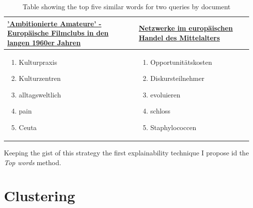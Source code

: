 \begin{table}
	\centering
	\begin{tabular}{ p{6cm} | p{6cm} }
		\href{https://gepris.dfg.de/gepris/projekt/387798678}{'Ambitionierte Amateure' - Europäische Filmclubs in den langen 1960er Jahren} & \href{https://gepris.dfg.de/gepris/projekt/160874660}{Netzwerke im europäischen Handel des Mittelalters} \\ \hline
		\begin{enumerate}
			\item Kulturpraxis
			\item Kulturzentren
			\item alltagsweltlich
			\item pain
			\item Ceuta
		\end{enumerate} & 
		\begin{enumerate}
			\item Opportunitätskosten
			\item Diskursteilnehmer
			\item evoluieren
			\item schloss
			\item Staphylococcen
		\end{enumerate} \\
	\end{tabular}
	\caption{\label{tab:semantic_connectivity_docs} Table showing the top five similar words for two queries by document}
\end{table}


Keeping the gist of this strategy the first explainability technique I propose id the \textit{Top words} method. 

\section{Clustering}

